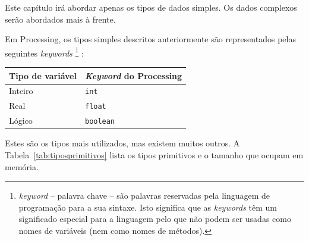 Este capítulo irá abordar apenas os tipos de dados simples. Os dados complexos serão abordados mais à frente.

Em Processing, os tipos simples descritos anteriormente são representados pelas seguintes \emph{keywords}%
\footnote{\emph{keyword} -- palavra chave -- são palavras reservadas pela linguagem de programação para a sua sintaxe. Isto significa que as \emph{keywords} têm um significado especial para a linguagem pelo que não podem ser usadas como nomes de variáveis (nem como nomes de métodos).}%
:
\begin{center}
\begin{tabular}{ll}
Tipo de variável 	& \emph{Keyword} do Processing\\
\hline
Inteiro 					& \texttt{int}\\
Real							& \texttt{float}\\
Lógico						& \texttt{boolean}\\
\hline
\end{tabular}
\end{center}
Estes são os tipos mais utilizados, mas existem muitos outros. A Tabela~\ref{tab:tiposprimitivos} lista os tipos primitivos e o tamanho que ocupam em memória.

